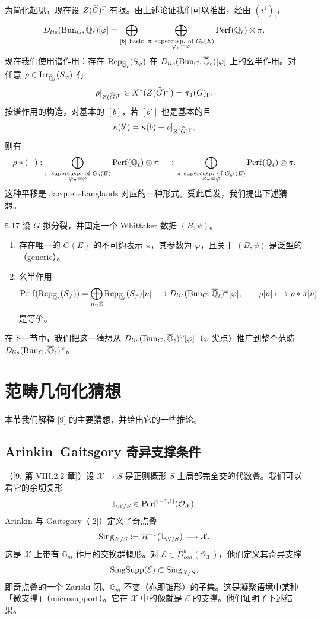 为简化起见，现在设 $Z(\widehat{G})^\Gamma$ 有限。由上述论证我们可以推出，经由 $(i^1)_!$，
\[
D_{lis}(\Bun_G,\overline{\Q}_\ell)[\varphi]=\bigoplus_{[b]\ \text{basic}}\ \bigoplus_{\substack{\pi\ \text{supercusp. of }G_b(E)\\ \varphi_\pi=\varphi}}\Perf(\overline{\Q}_\ell)\otimes\pi.
\]
现在我们使用谱作用：存在 $\operatorname{Rep}_{\overline{\mathbb{Q}}_\ell}(S_\varphi)$ 在 $D_{lis}(\operatorname{Bun}_G,\overline{\mathbb{Q}}_\ell)[\varphi]$ 上的幺半作用。对任意 $\rho\in\mathrm{Irr}_{\overline{\mathbb{Q}}_\ell}(S_\varphi)$ 有
\[
\rho|_{Z(\widehat{G})^\Gamma}\in X^*(Z(\widehat{G})^\Gamma)=\pi_1(G)_\Gamma.
\]
按谱作用的构造，对基本的 $[b]$，若 $[b']$ 也是基本的且
\[
\kappa(b')=\kappa(b)+\rho|_{Z(\widehat{G})^\Gamma},
\]
则有
\[
\rho*(-):\bigoplus_{\substack{\pi\ \text{supercusp. of }G_b(E)\\ \varphi_\pi=\varphi}}\Perf(\overline{\Q}_\ell)\otimes\pi\longrightarrow\bigoplus_{\substack{\pi\ \text{supercusp. of }G_{b'}(E)\\ \varphi_\pi=\varphi}}\Perf(\overline{\Q}_\ell)\otimes\pi.
\]
这种平移是 Jacquet--Langlands 对应的一种形式。受此启发，我们提出下述猜想。

\begin{conj}{5.17}\label{conj:a3-5-17}
设 $G$ 拟分裂，并固定一个 Whittaker 数据 $(B,\psi)$。
\begin{enumerate}[label=(\arabic*),leftmargin=2.6em,itemsep=0.2em]
\item 存在唯一的 $G(E)$ 的不可约表示 $\pi$，其参数为 $\varphi$，且关于 $(B,\psi)$ 是泛型的（generic）。
\item 幺半作用
\[
\operatorname{Perf}(\operatorname{Rep}_{\overline{\mathbb{Q}}_\ell}(S_\varphi))=\bigoplus_{n\in\mathbb{Z}}\operatorname{Rep}_{\overline{\mathbb{Q}}_\ell}(S_\varphi)[n]\longrightarrow D_{lis}(\operatorname{Bun}_G,\overline{\mathbb{Q}}_\ell)^\omega[\varphi],\qquad \rho[n]\longmapsto\rho*\pi[n]
\]
是等价。
\end{enumerate}
\end{conj}

在下一节中，我们把这一猜想从 $D_{lis}(\operatorname{Bun}_G,\overline{\mathbb{Q}}_\ell)^\omega[\varphi]$（$\varphi$ 尖点）推广到整个范畴 $D_{lis}(\operatorname{Bun}_G,\overline{\mathbb{Q}}_\ell)^\omega$。

\section{范畴几何化猜想}
本节我们解释 [9] 的主要猜想，并给出它的一些推论。

\subsection{Arinkin--Gaitsgory 奇异支撑条件}
（[9, 第 VIII.2.2 章]）设 $\mathcal{X}\to S$ 是正则概形 $S$ 上局部完全交的代数叠。我们可以看它的余切复形
\[
\mathbb{L}_{\mathcal{X}/S}\in\operatorname{Perf}^{[-1,1]}(\mathcal{O}_{\mathcal{X}}).
\]
Arinkin 与 Gaitsgory（[2]）定义了奇点叠
\[
\operatorname{Sing}_{\mathcal{X}/S}:=\mathcal{H}^{-1}(\mathbb{L}_{\mathcal{X}/S})\longrightarrow\mathcal{X}.
\]
这是 $\mathcal{X}$ 上带有 $\mathbb{G}_m$ 作用的交换群概形。对 $\mathcal{E}\in D^b_{coh}(\mathcal{O}_{\mathcal{X}})$，他们定义其奇异支撑
\[
\mathrm{SingSupp}(\mathcal{E})\subset\operatorname{Sing}_{\mathcal{X}/S},
\]
即奇点叠的一个 Zariski 闭、$\mathbb{G}_m$-不变（亦即锥形）的子集。这是凝聚语境中某种「微支撑」（microsupport）。它在 $\mathcal{X}$ 中的像就是 $\mathcal{E}$ 的支撑。他们证明了下述结果。

